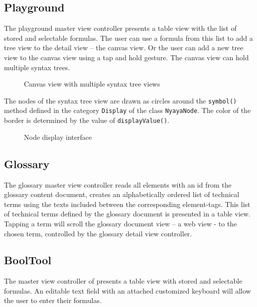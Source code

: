 \subsection{Playground}

The playground master view controller presents a table view with the list of stored and selectable formulas.
The user can use a formula from this list to add a tree view to the detail view – the canvas view.
Or the user can add a new tree view to the canvas view using a tap and hold gesture.
The canvas view can hold multiple syntax trees.

\begin{figure}[htbp]
\begin{center}
\caption{Canvas view with multiple syntax tree views}
\label{fig:TreeView}
\end{center}
\end{figure}

The nodes of the syntax tree view are drawn as circles around the \verb+symbol()+ 
method defined in the category
\verb+Display+ of the class \verb+NyayaNode+.
The color of the border is determined by the value of \verb+displayValue()+.


\begin{figure}[htbp]
\begin{center}
\caption{Node display interface}
\label{fig:NyayaNodeDisplay}
\end{center}
\end{figure}

\subsection{Glossary}

The glossary master view controller reads all elements with an id from the glossary content document,
creates an alphabetically ordered list of technical terms using the texts included between the corresponding element-tags.
This list of technical terms defined by the glossary document is presented in a table view.
Tapping a term will scroll the glossary document view – a web view - to the chosen term, 
controlled by the glossary detail view controller.

\subsection{BoolTool}

The master view controller of \BoolTool presents a table view with stored and selectable formulas.
An editable text field with an attached customized keyboard will allow the user to enter their formulas.

